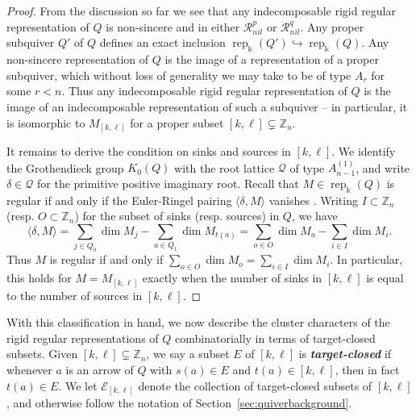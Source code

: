 \documentclass[12pt]{amsart}
\newcommand{\newword}[1]{\textbf{\emph{#1}}}
\newcommand{\ZZ}{\mathbb{Z}}
\newcommand{\kk}{\Bbbk}
\newcommand{\KQ}{K_0(Q)}
\newcommand{\cE}{\mathcal{E}}
\newcommand{\cQ}{\mathcal{Q}}
\newcommand{\cR}{\mathcal{R}}
\newcommand{\rep}{\operatorname{rep}}
\newcommand\into{\hookrightarrow}
\newcommand{\Qrep}{M}
\theoremstyle{remark}
\numberwithin{equation}{section}
\numberwithin{figure}{section}
\begin{document}
\begin{proof}
  From the discussion so far we see that any indecomposable rigid regular representation of $Q$ is non-sincere and in either $\cR_{nil}^p$ or $\cR_{nil}^q$.
  Any proper subquiver $Q'$ of $Q$ defines an exact inclusion $\rep_\kk(Q') \into \rep_\kk(Q)$.
  Any non-sincere representation of $Q$ is the image of a representation of a proper subquiver, which without loss of generality we may take to be of type $A_r$ for some $r < n$.
  Thus any indecomposable rigid regular representation of $Q$ is the image of an indecomposable representation of such a subquiver -- in particular, it is isomorphic to $\Qrep_{[k,\ell]}$ for a proper subset $[k,\ell]\subsetneq\ZZ_n$.

  It remains to derive the condition on sinks and sources in $[k,\ell]$.
  We identify the Grothendieck group $\KQ$ with the root lattice $\cQ$ of type $A_{n-1}^{\!(1)}$, and write $\delta\in\cQ$ for the primitive positive imaginary root.
  Recall that $\Qrep \in \rep_\kk(Q)$ is regular if and only if the Euler-Ringel pairing $\langle\delta,\Qrep\rangle$ vanishes \cite[Section 7]{CB92}.
  Writing $I \subset \ZZ_n$ (resp. $O \subset \ZZ_n$) for the subset of sinks (resp. sources) in $Q$, we have
  \[
    \langle\delta,\Qrep\rangle
    =
    \sum_{j\in Q_0}\dim \Qrep_j-\sum_{a\in Q_1}\dim \Qrep_{t(a)}
    =
    \sum_{o\in O}\dim \Qrep_o-\sum_{i\in I}\dim \Qrep_i.
  \]
  Thus $\Qrep$ is regular if and only if $\sum\limits_{o\in O}\dim \Qrep_o=\sum\limits_{i\in I}\dim \Qrep_i$.
  In particular, this holds for $\Qrep = \Qrep_{[k,\ell]}$ exactly when the number of sinks in $[k,\ell]$ is equal to the number of sources in $[k,\ell]$.
\end{proof}

With this classification in hand, we now describe the cluster characters of the rigid regular representations of $Q$ combinatorially in terms of target-closed subsets.
Given $[k,\ell]\subsetneq\ZZ_n$, we say a subset $E$ of $[k,\ell]$ is \newword{target-closed} if whenever $a$ is an arrow of $Q$ with $s(a) \in E$ and $t(a) \in [k,\ell]$, then in fact $t(a) \in E$.
We let $\cE_{[k,\ell]}$ denote the collection of target-closed subsets of $[k,\ell]$, and otherwise follow the notation of Section~\ref{sec:quiverbackground}.
\end{document}
